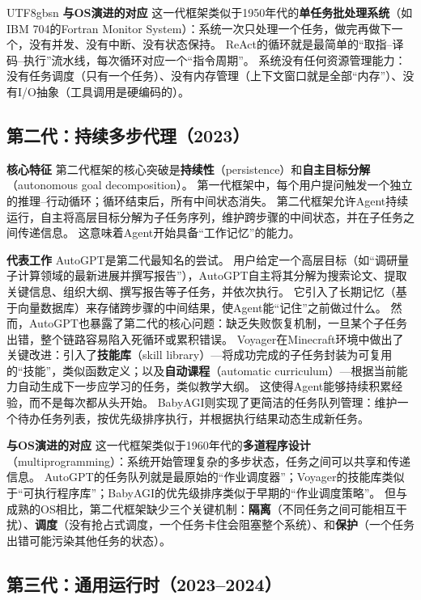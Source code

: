 \documentclass[11pt,a4paper]{article}
\begin{document}
\begin{CJK*}{UTF8}{gbsn}
\textbf{与OS演进的对应}
这一代框架类似于1950年代的\textbf{单任务批处理系统}（如IBM 704的Fortran Monitor System）：系统一次只处理一个任务，做完再做下一个，没有并发、没有中断、没有状态保持。
ReAct的循环就是最简单的``取指--译码--执行''流水线，每次循环对应一个``指令周期''。
系统没有任何资源管理能力：没有任务调度（只有一个任务）、没有内存管理（上下文窗口就是全部``内存''）、没有I/O抽象（工具调用是硬编码的）。

\subsection*{第二代：持续多步代理（2023）}

\textbf{核心特征}
第二代框架的核心突破是\textbf{持续性}（persistence）和\textbf{自主目标分解}（autonomous goal decomposition）。
第一代框架中，每个用户提问触发一个独立的推理--行动循环；循环结束后，所有中间状态消失。
第二代框架允许Agent持续运行，自主将高层目标分解为子任务序列，维护跨步骤的中间状态，并在子任务之间传递信息。
这意味着Agent开始具备``工作记忆''的能力。

\textbf{代表工作}
AutoGPT\cite{autogpt_repo_2026}是第二代最知名的尝试。
用户给定一个高层目标（如``调研量子计算领域的最新进展并撰写报告''），AutoGPT自主将其分解为搜索论文、提取关键信息、组织大纲、撰写报告等子任务，并依次执行。
它引入了长期记忆（基于向量数据库）来存储跨步骤的中间结果，使Agent能``记住''之前做过什么。
然而，AutoGPT也暴露了第二代的核心问题：缺乏失败恢复机制，一旦某个子任务出错，整个链路容易陷入死循环或累积错误。
Voyager\cite{wang2023voyager}在Minecraft环境中做出了关键改进：引入了\textbf{技能库}（skill library）---将成功完成的子任务封装为可复用的``技能''，类似函数定义；以及\textbf{自动课程}（automatic curriculum）---根据当前能力自动生成下一步应学习的任务，类似教学大纲。
这使得Agent能够持续积累经验，而不是每次都从头开始。
BabyAGI则实现了更简洁的任务队列管理：维护一个待办任务列表，按优先级排序执行，并根据执行结果动态生成新任务。

\textbf{与OS演进的对应}
这一代框架类似于1960年代的\textbf{多道程序设计}（multiprogramming）：系统开始管理复杂的多步状态，任务之间可以共享和传递信息。
AutoGPT的任务队列就是最原始的``作业调度器''；Voyager的技能库类似于``可执行程序库''；BabyAGI的优先级排序类似于早期的``作业调度策略''。
但与成熟的OS相比，第二代框架缺少三个关键机制：\textbf{隔离}（不同任务之间可能相互干扰）、\textbf{调度}（没有抢占式调度，一个任务卡住会阻塞整个系统）、和\textbf{保护}（一个任务出错可能污染其他任务的状态）。

\subsection*{第三代：通用运行时（2023--2024）}


\end{CJK*}
\end{document}
